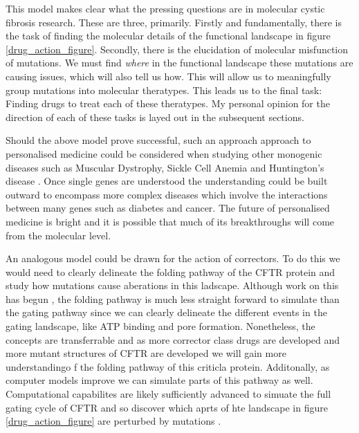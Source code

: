 This model makes clear what the pressing questions are in molecular cystic fibrosis research. These are three, primarily. Firstly and fundamentally, there is the task of finding the molecular details of the functional landscape in figure \ref{drug_action_figure}. Secondly, there is the elucidation of molecular misfunction of mutations. We must find \textit {where} in the functional landscape these mutations are causing issues, which will also tell us how. This will allow us to meaningfully group mutations into molecular theratypes. This leads us to the final task: Finding drugs to treat each of these theratypes. My personal opinion for the direction of each of these tasks is layed out in the subsequent sections.

Should the above model prove successful, such an approach approach to personalised medicine could  be considered when studying other monogenic diseases such as Muscular  Dystrophy, Sickle Cell Anemia and Huntington's disease \cite{}. Once single genes are understood the understanding could be built outward to encompass more complex diseases which involve the interactions between many genes such as diabetes and cancer. The future of personalised medicine is bright and it is possible that much of its breakthroughs will come from the molecular level.

An analogous model could be drawn for the action of correctors. To do this we would need to clearly delineate the folding pathway of the CFTR protein and study how mutations cause aberations in this ladscape. Although work on this has begun \cite{krainer2018, kleizen2021, kleizen2020, fiedorczuk2022}, the folding pathway is much less straight forward to simulate than the gating pathway since we can clearly delineate the different events in the gating landscape, like ATP binding and pore formation. Nonetheless, the concepts are transferrable and as more corrector class drugs are developed and more mutant structures of CFTR are developed we will gain more understandingo f the folding pathway of this criticla protein. Additonally, as computer models improve we can simulate parts of this pathway as well. Computational capabilites are likely sufficiently advanced to simuate the full gating cycle of CFTR and so discover which aprts of hte landscape in figure \ref{drug_action_figure} are perturbed by mutations \cite{}. 


